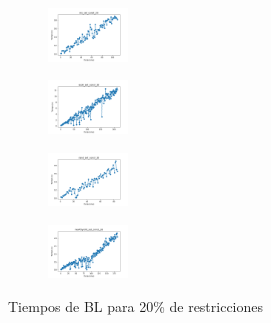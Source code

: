 \begin{figure}[H]
\begin{subfigure}
        \centering
        \includegraphics[width=0.234\textwidth]{img/bl/iris_set_const_20_3773969821_time.png}
    \end{subfigure}
    \hfill
    \begin{subfigure}
        \centering
        \includegraphics[width=0.234\textwidth]{img/bl/ecoli_set_const_20_3773969821_time.png}
    \end{subfigure}
    \hfill
    \begin{subfigure}
        \centering
        \includegraphics[width=0.234\textwidth]{img/bl/rand_set_const_20_3773969821_time.png}
    \end{subfigure}
    \hfill
    \begin{subfigure}
        \centering
        \includegraphics[width=0.234\textwidth]{img/bl/newthyroid_set_const_20_3773969821_time.png}
    \end{subfigure}
    \caption{Tiempos de BL para 20\% de restricciones}
\end{figure}

\vspace*{\fill}
\newpage
\vspace*{\fill}

